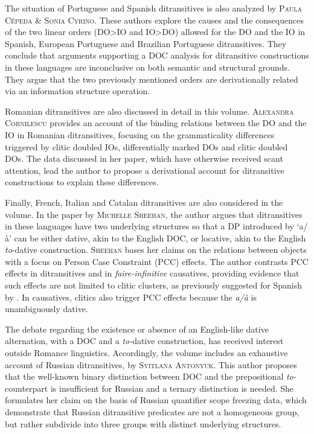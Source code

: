 \documentclass[output=paper,modfonts,nonflat,colorlinks,citecolor=brown]{langsci/langscibook}
\begin{document}
The situation of Portuguese and Spanish ditransitives is also analyzed by {\textsc{Paula Cépeda \& Sonia Cyrino}}. These authors explore the causes and the consequences of the two linear orders (DO>IO and IO>DO) allowed for the DO and the IO in Spanish, European Portuguese and Brazilian Portuguese ditransitives. They conclude that arguments supporting a DOC analysis for ditransitive constructions in these languages are inconclusive on both semantic and structural grounds. They argue that the two previously mentioned orders are derivationally related via an information structure operation.



Romanian ditransitives are also discussed in detail in this volume. {\textsc{Alexandra Cornilescu}} provides an account of the binding relations between the DO and the IO in Romanian ditransitives, focusing on the grammaticality differences triggered by clitic doubled IOs, differentially marked DOs and clitic doubled DOs. The data discussed in her paper, which have otherwise received scant attention, lead the author to propose a derivational account for ditransitive constructions to explain these differences.



Finally, French, Italian and Catalan ditransitives are also considered in the volume. In the paper by {\textsc{Michelle Sheehan,}} the author argues that ditransitives in these languages have two underlying structures so that a DP introduced by ‘a/à’ can be either dative, akin to the English DOC, or locative, akin to the English {\textit{to}}{}-dative construction. {\textsc{Sheehan}} bases her claims on the relations between objects with a focus on Person Case Constraint (PCC) effects. The author contrasts PCC effects in ditransitives and in {\textit{faire-infinitive}} causatives, providing evidence that such effects are not limited to clitic clusters, as previously suggested for Spanish by \citet{OrmazabalRomero2013}. In causatives, clitics also trigger PCC effects because the {\textit{a/à}} is unambiguously dative.



The debate regarding the existence or absence of an English-like dative alternation, with a DOC and a {\textit{to-}}dative construction, has received interest outside Romance linguistics. Accordingly, the volume includes an exhaustive account of Russian ditransitives, by \textsc{Svitlana} {\textsc{Antonyuk.}} This author proposes that the well-known binary distinction between DOC and the prepositional {\textit{to-}}counterpart is insufficient for Russian and a ternary distinction is needed. She formulates her claim on the basis of Russian quantifier scope freezing data, which demonstrate that Russian ditransitive predicates are not a homogeneous group, but rather subdivide into three groups with distinct underlying structures. 
\end{document}
